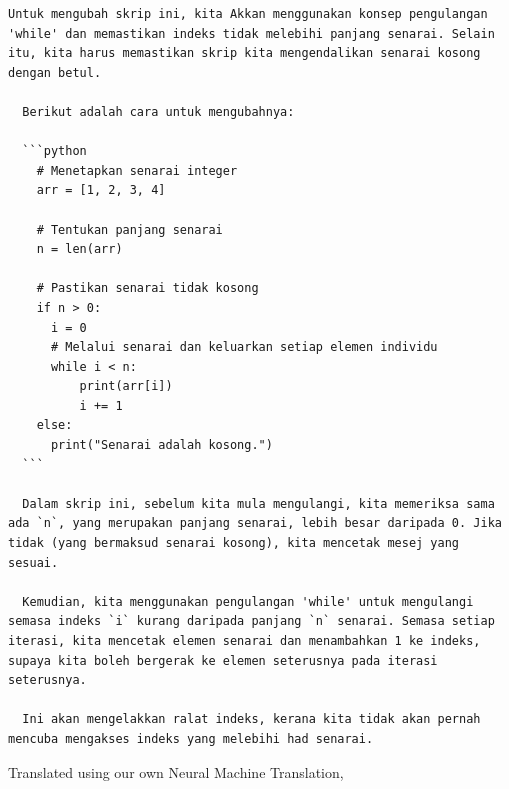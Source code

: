 \documentclass[preprint]{article}
\begin{document}
\begin{lstlisting}[breaklines=true]
  Untuk mengubah skrip ini, kita Akkan menggunakan konsep pengulangan 'while' dan memastikan indeks tidak melebihi panjang senarai. Selain itu, kita harus memastikan skrip kita mengendalikan senarai kosong dengan betul.

  Berikut adalah cara untuk mengubahnya:

  ```python
    # Menetapkan senarai integer
    arr = [1, 2, 3, 4]

    # Tentukan panjang senarai
    n = len(arr)

    # Pastikan senarai tidak kosong
    if n > 0:
      i = 0
      # Melalui senarai dan keluarkan setiap elemen individu
      while i < n:
          print(arr[i])
          i += 1
    else:
      print("Senarai adalah kosong.")
  ```

  Dalam skrip ini, sebelum kita mula mengulangi, kita memeriksa sama ada `n`, yang merupakan panjang senarai, lebih besar daripada 0. Jika tidak (yang bermaksud senarai kosong), kita mencetak mesej yang sesuai.

  Kemudian, kita menggunakan pengulangan 'while' untuk mengulangi semasa indeks `i` kurang daripada panjang `n` senarai. Semasa setiap iterasi, kita mencetak elemen senarai dan menambahkan 1 ke indeks, supaya kita boleh bergerak ke elemen seterusnya pada iterasi seterusnya.

  Ini akan mengelakkan ralat indeks, kerana kita tidak akan pernah mencuba mengakses indeks yang melebihi had senarai.
\end{lstlisting}



Translated using our own Neural Machine Translation,
\end{document}
